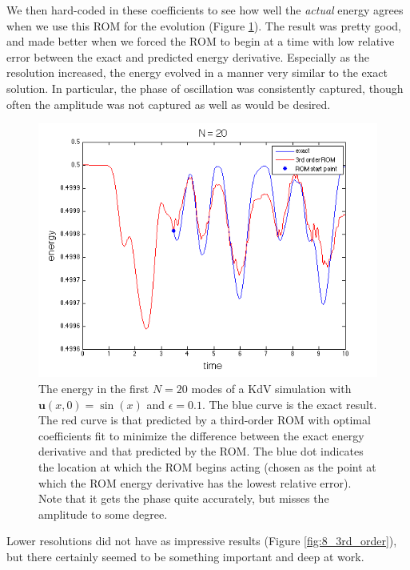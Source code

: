 \documentclass{article}
\begin{document}
We then hard-coded in these coefficients to see how well the \emph{actual} energy agrees when we use this ROM for the evolution (Figure \ref{fig:20_3rd_order}). The result was pretty good, and made better when we forced the ROM to begin at a time with low relative error between the exact and predicted energy derivative. Especially as the resolution increased, the energy evolved in a manner very similar to the exact solution. In particular, the phase of oscillation was consistently captured, though often the amplitude was not captured as well as would be desired.

\begin{figure}[h]
\includegraphics[width=\textwidth]{3rd_order_20.png}
\caption{The energy in the first $N=20$ modes of a KdV simulation with $\mathbf{u}(x,0) = \sin(x)$ and $\epsilon=0.1$. The blue curve is the exact result. The red curve is that predicted by a third-order ROM with optimal coefficients fit to minimize the difference between the exact energy derivative and that predicted by the ROM. The blue dot indicates the location at which the ROM begins acting (chosen as the point at which the ROM energy derivative has the lowest relative error). Note that it gets the phase quite accurately, but misses the amplitude to some degree.}\label{fig:20_3rd_order}
\end{figure}

Lower resolutions did not have as impressive results (Figure \ref{fig:8_3rd_order}), but there certainly seemed to be something important and deep at work.
\end{document}
